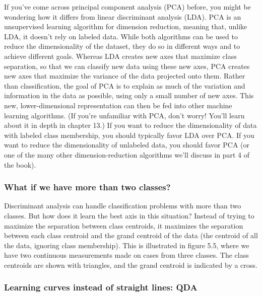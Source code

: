 \documentclass[
]{article}
\begin{document}
If you've come across principal component analysis (PCA) before, you
might be wondering how it differs from linear discriminant analysis
(LDA). PCA is an unsupervised learning algorithm for dimension
reduction, meaning that, unlike LDA, it doesn't rely on labeled data.
While both algorithms can be used to reduce the dimensionality of the
dataset, they do so in different ways and to achieve different goals.
Whereas LDA creates new axes that maximize class separation, so that we
can classify new data using these new axes, PCA creates new axes that
maximize the variance of the data projected onto them. Rather than
classification, the goal of PCA is to explain as much of the variation
and information in the data as possible, using only a small number of
new axes. This new, lower-dimensional representation can then be fed
into other machine learning algorithms. (If you're unfamiliar with PCA,
don't worry! You'll learn about it in depth in chapter 13.) If you want
to reduce the dimensionality of data with labeled class membership, you
should typically favor LDA over PCA. If you want to reduce the
dimensionality of unlabeled data, you should favor PCA (or one of the
many other dimension-reduction algorithms we'll discuss in part 4 of the
book).

\subsubsection{What if we have more than two
classes?}\label{what-if-we-have-more-than-two-classes}

Discriminant analysis can handle classification problems with more than
two classes. But how does it learn the best axis in this situation?
Instead of trying to maximize the separation between class centroids, it
maximizes the separation between each class centroid and the grand
centroid of the data (the centroid of all the data, ignoring class
membership). This is illustrated in figure 5.5, where we have two
continuous measurements made on cases from three classes. The class
centroids are shown with triangles, and the grand centroid is indicated
by a cross.

\subsubsection{Learning curves instead of straight lines:
QDA}\label{learning-curves-instead-of-straight-lines-qda}
\end{document}
